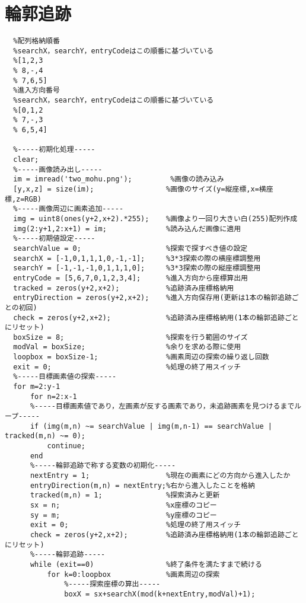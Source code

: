 \documentclass[a4j]{jarticle}
\begin{document}
\section{輪郭追跡}
\begin{verbatim}
  %配列格納順番
  %searchX，searchY，entryCodeはこの順番に基づいている
  %[1,2,3
  % 8,-,4
  % 7,6,5]
  %進入方向番号
  %searchX，searchY，entryCodeはこの順番に基づいている
  %[0,1,2
  % 7,-,3
  % 6,5,4]

  %-----初期化処理-----
  clear;
  %-----画像読み出し-----
  im = imread('two_mohu.png');         %画像の読み込み
  [y,x,z] = size(im);                 %画像のサイズ(y=縦座標,x=横座標,z=RGB)
  %-----画像周辺に画素追加-----
  img = uint8(ones(y+2,x+2).*255);    %画像より一回り大きい白(255)配列作成
  img(2:y+1,2:x+1) = im;              %読み込んだ画像に適用
  %-----初期値設定-----
  searchValue = 0;                    %探索で探すべき値の設定
  searchX = [-1,0,1,1,1,0,-1,-1];     %3*3探索の際の横座標調整用
  searchY = [-1,-1,-1,0,1,1,1,0];     %3*3探索の際の縦座標調整用
  entryCode = [5,6,7,0,1,2,3,4];      %進入方向から座標算出用
  tracked = zeros(y+2,x+2);           %追跡済み座標格納用
  entryDirection = zeros(y+2,x+2);    %進入方向保存用(更新は1本の輪郭追跡ごとの初回)
  check = zeros(y+2,x+2);             %追跡済み座標格納用(1本の輪郭追跡ごとにリセット)
  boxSize = 8;                        %探索を行う範囲のサイズ
  modVal = boxSize;                   %余りを求める際に使用
  loopbox = boxSize-1;                %画素周辺の探索の繰り返し回数
  exit = 0;                           %処理の終了用スイッチ
  %-----目標画素値の探索-----
  for m=2:y-1
      for n=2:x-1
      %-----目標画素値であり，左画素が反する画素であり，未追跡画素を見つけるまでループ-----
      if (img(m,n) ~= searchValue | img(m,n-1) == searchValue | tracked(m,n) ~= 0);
          continue;
      end
      %-----輪郭追跡で称する変数の初期化-----
      nextEntry = 1;                  %現在の画素にどの方向から進入したか
      entryDirection(m,n) = nextEntry;%右から進入したことを格納
      tracked(m,n) = 1;               %探索済みと更新
      sx = n;                         %x座標のコピー
      sy = m;                         %y座標のコピー
      exit = 0;                       %処理の終了用スイッチ
      check = zeros(y+2,x+2);         %追跡済み座標格納用(1本の輪郭追跡ごとにリセット)
      %-----輪郭追跡-----
      while (exit==0)                 %終了条件を満たすまで続ける
          for k=0:loopbox             %画素周辺の探索
              %-----探索座標の算出-----
              boxX = sx+searchX(mod(k+nextEntry,modVal)+1);

\end{verbatim}
\end{document}
